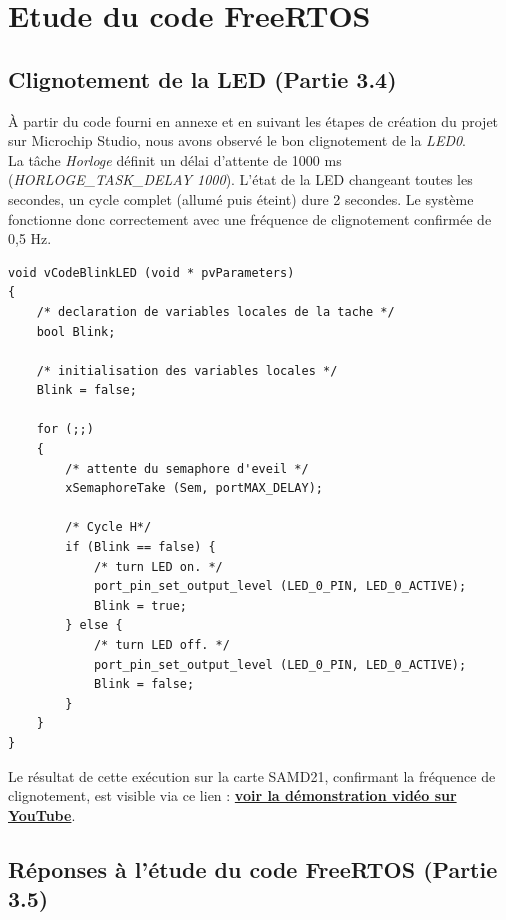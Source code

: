 \section{Etude du code FreeRTOS}

\subsection{Clignotement de la LED (Partie 3.4)}

À partir du code fourni en annexe et en suivant les étapes de création du projet sur Microchip Studio, nous avons observé le bon clignotement de la \textit{LED0}. \\

La tâche \textit{Horloge} définit un délai d'attente de 1000 ms (\textit{HORLOGE\_TASK\_DELAY 1000}). L'état de la LED changeant toutes les secondes, un cycle complet (allumé puis éteint) dure 2 secondes. Le système fonctionne donc correctement avec une fréquence de clignotement confirmée de 0,5 Hz.

\begin{lstlisting}[style=code]
void vCodeBlinkLED (void * pvParameters)
{
    /* declaration de variables locales de la tache */
    bool Blink;
    
    /* initialisation des variables locales */
    Blink = false;
    
    for (;;)
    {
        /* attente du semaphore d'eveil */
        xSemaphoreTake (Sem, portMAX_DELAY);
        
        /* Cycle H*/
        if (Blink == false) {
            /* turn LED on. */
            port_pin_set_output_level (LED_0_PIN, LED_0_ACTIVE);
            Blink = true;
        } else {
            /* turn LED off. */
            port_pin_set_output_level (LED_0_PIN, LED_0_ACTIVE);
            Blink = false;
        }
    }
}
\end{lstlisting}

Le résultat de cette exécution sur la carte SAMD21, confirmant la fréquence de clignotement, est visible via ce lien : \href{https://youtu.be/XMjjLOAeuDM}{\textbf{voir la démonstration vidéo sur YouTube}}.

\subsection{Réponses à l'étude du code FreeRTOS (Partie 3.5)}

